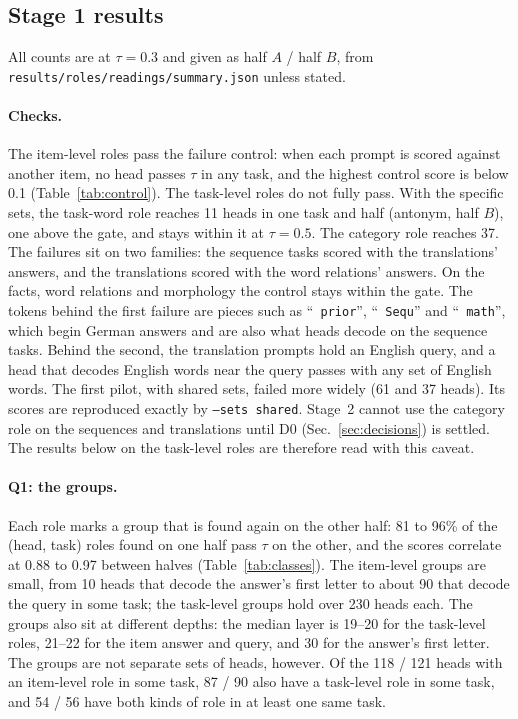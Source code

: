 \documentclass[10pt,a4paper]{article}
\newcommand{\p}[1]{``\texttt{#1}''}
\begin{document}
\subsection{Stage 1 results}\label{sec:stage1-results}

All counts are at $\tau=0.3$ and given as half $A$ / half $B$, from \texttt{results/roles/readings/summary.json} unless stated.





\paragraph{Checks.} The item-level roles pass the failure control: when each prompt is scored against another item, no head passes $\tau$ in any task, and the highest control score is below 0.1 (Table~\ref{tab:control}). The task-level roles do not fully pass. With the specific sets, the task-word role reaches 11 heads in one task and half (antonym, half $B$), one above the gate, and stays within it at $\tau=0.5$. The category role reaches 37. The failures sit on two families: the sequence tasks scored with the translations' answers, and the translations scored with the word relations' answers. On the facts, word relations and morphology the control stays within the gate. The tokens behind the first failure are pieces such as \p{ prior}, \p{ Sequ} and \p{ math}, which begin German answers and are also what heads decode on the sequence tasks. Behind the second, the translation prompts hold an English query, and a head that decodes English words near the query passes with any set of English words. The first pilot, with shared sets, failed more widely (61 and 37 heads). Its scores are reproduced exactly by \texttt{--sets shared}. Stage~2 cannot use the category role on the sequences and translations until D0 (Sec.~\ref{sec:decisions}) is settled. The results below on the task-level roles are therefore read with this caveat.

\paragraph{Q1: the groups.} Each role marks a group that is found again on the other half: 81 to 96\% of the (head, task) roles found on one half pass $\tau$ on the other, and the scores correlate at 0.88 to 0.97 between halves (Table~\ref{tab:classes}). The item-level groups are small, from 10 heads that decode the answer's first letter to about 90 that decode the query in some task; the task-level groups hold over 230 heads each. The groups also sit at different depths: the median layer is 19--20 for the task-level roles, 21--22 for the item answer and query, and 30 for the answer's first letter. The groups are not separate sets of heads, however. Of the 118 / 121 heads with an item-level role in some task, 87 / 90 also have a task-level role in some task, and 54 / 56 have both kinds of role in at least one same task.
\end{document}
